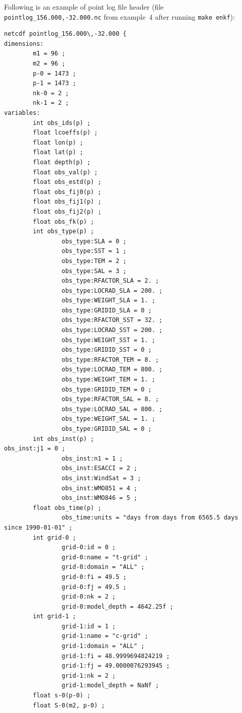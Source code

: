 \documentclass[11pt]{report}
\begin{document}
Following is an example of point log file header (file \verb|pointlog_156.000,-32.000.nc| from example~4 after running \verb|make enkf|):
\begin{Verbatim}[frame=single,fontsize=\footnotesize]
netcdf pointlog_156.000\,-32.000 {
dimensions:
        m1 = 96 ;
        m2 = 96 ;
        p-0 = 1473 ;
        p-1 = 1473 ;
        nk-0 = 2 ;
        nk-1 = 2 ;
variables:
        int obs_ids(p) ;
        float lcoeffs(p) ;
        float lon(p) ;
        float lat(p) ;
        float depth(p) ;
        float obs_val(p) ;
        float obs_estd(p) ;
        float obs_fij0(p) ;
        float obs_fij1(p) ;
        float obs_fij2(p) ;
        float obs_fk(p) ;
        int obs_type(p) ;
                obs_type:SLA = 0 ;
                obs_type:SST = 1 ;
                obs_type:TEM = 2 ;
                obs_type:SAL = 3 ;
                obs_type:RFACTOR_SLA = 2. ;
                obs_type:LOCRAD_SLA = 200. ;
                obs_type:WEIGHT_SLA = 1. ;
                obs_type:GRIDID_SLA = 0 ;
                obs_type:RFACTOR_SST = 32. ;
                obs_type:LOCRAD_SST = 200. ;
                obs_type:WEIGHT_SST = 1. ;
                obs_type:GRIDID_SST = 0 ;
                obs_type:RFACTOR_TEM = 8. ;
                obs_type:LOCRAD_TEM = 800. ;
                obs_type:WEIGHT_TEM = 1. ;
                obs_type:GRIDID_TEM = 0 ;
                obs_type:RFACTOR_SAL = 8. ;
                obs_type:LOCRAD_SAL = 800. ;
                obs_type:WEIGHT_SAL = 1. ;
                obs_type:GRIDID_SAL = 0 ;
        int obs_inst(p) ;                                                                       obs_inst:j1 = 0 ;
                obs_inst:n1 = 1 ;
                obs_inst:ESACCI = 2 ;
                obs_inst:WindSat = 3 ;
                obs_inst:WMO851 = 4 ;
                obs_inst:WMO846 = 5 ;
        float obs_time(p) ;
                obs_time:units = "days from days from 6565.5 days since 1990-01-01" ;
        int grid-0 ;
                grid-0:id = 0 ;
                grid-0:name = "t-grid" ;
                grid-0:domain = "ALL" ;
                grid-0:fi = 49.5 ;
                grid-0:fj = 49.5 ;
                grid-0:nk = 2 ;
                grid-0:model_depth = 4642.25f ;
        int grid-1 ;
                grid-1:id = 1 ;
                grid-1:name = "c-grid" ;
                grid-1:domain = "ALL" ;
                grid-1:fi = 48.9999694824219 ;
                grid-1:fj = 49.0000076293945 ;
                grid-1:nk = 2 ;
                grid-1:model_depth = NaNf ;
        float s-0(p-0) ;
        float S-0(m2, p-0) ;

\end{Verbatim}
\end{document}

